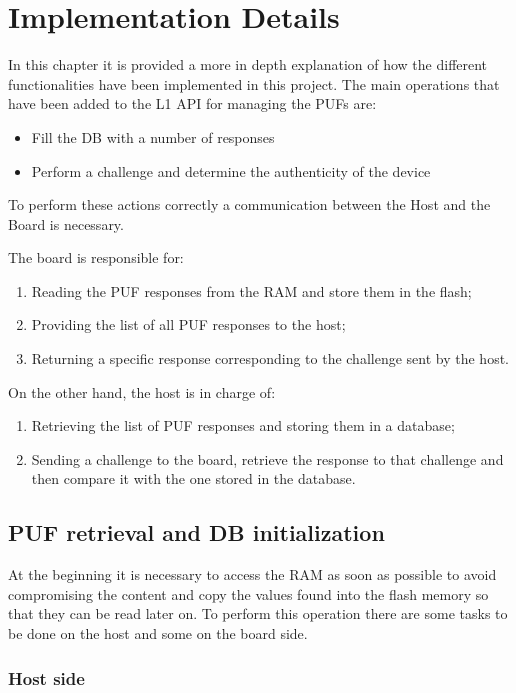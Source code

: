 \chapter{Implementation Details}
In this chapter it is provided a more in depth explanation of how the different functionalities have been implemented in this project. The main operations that have been added to the L1 API for managing the PUFs are:
\begin{itemize}
	\item Fill the DB with a number of responses
 	\item Perform a challenge and determine the authenticity of the device  
\end{itemize}

To perform these actions correctly a communication between the Host and the Board is necessary. 

The board is responsible for:
\begin{enumerate}
	\item Reading the PUF responses from the RAM and store them in the flash;
	\item Providing the list of all PUF responses to the host;
	\item Returning a specific response corresponding to the challenge sent by the host.
\end{enumerate}

On the other hand, the host is in charge of:
\begin{enumerate}
	\item Retrieving the list of PUF responses and storing them in a database;
	\item Sending a challenge to the board, retrieve the response to that challenge and then compare it with the one stored in the database.
\end{enumerate}


\section {PUF retrieval and DB initialization}
At the beginning it is necessary to access the RAM as soon as possible to avoid compromising the content and copy the values found into the flash memory so that they can be read later on. To perform this operation there are some tasks to be done on the host and some on the board side.

\subsection{Host side}

